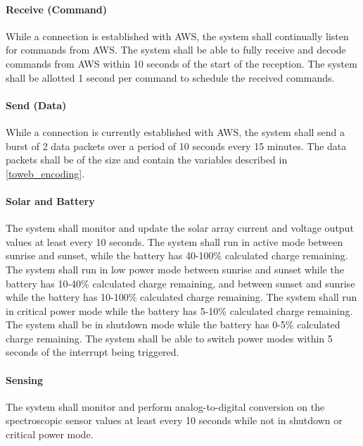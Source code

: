 \paragraph{Receive (Command)} While a connection is established with AWS, the system shall continually listen for commands from AWS. The system shall be able to fully receive and decode commands from AWS within 10 seconds of the start of the reception. The system shall be allotted 1 second per command to schedule the received commands.

\paragraph{Send (Data)} While a connection is currently established with AWS, the system shall send a burst of 2 data packets over a period of 10 seconds every 15 minutes. The data packets shall be of the size and contain the variables described in \autoref{toweb_encoding}.

\paragraph{Solar and Battery} The system shall monitor and update the solar array current and voltage output values at least every 10 seconds. The system shall run in active mode between sunrise and sunset, while the battery has 40-100\% calculated charge remaining. The system shall run in low power mode between sunrise and sunset while the battery has 10-40\% calculated charge remaining, and between sunset and sunrise while the battery has 10-100\% calculated charge remaining. The system shall run in critical power mode while the battery has 5-10\% calculated charge remaining. The system shall be in shutdown mode while the battery has 0-5\% calculated charge remaining. The system shall be able to switch power modes within 5 seconds of the interrupt being triggered.

\paragraph{Sensing} The system shall monitor and perform analog-to-digital conversion on the spectroscopic sensor values at least every 10 seconds while not in shutdown or critical power mode.